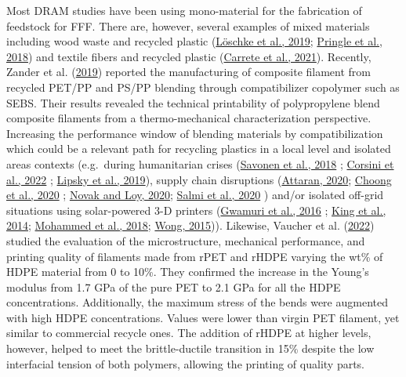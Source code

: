 \documentclass[
  12pt,
]{article}
\begin{document}
Most DRAM studies have been using mono-material for the fabrication of
feedstock for FFF. There are, however, several examples of mixed
materials including wood waste and recycled plastic
(\protect\hyperlink{ref-loschke2019}{Löschke et al., 2019};
\protect\hyperlink{ref-pringle2018}{Pringle et al., 2018}) and textile
fibers and recycled plastic (\protect\hyperlink{ref-carrete2021}{Carrete
et al., 2021}). Recently, Zander et al.
(\protect\hyperlink{ref-Zander2019}{2019}) reported the manufacturing of
composite filament from recycled PET/PP and PS/PP blending through
compatibilizer copolymer such as SEBS. Their results revealed the
technical printability of polypropylene blend composite filaments from a
thermo-mechanical characterization perspective. Increasing the
performance window of blending materials by compatibilization which
could be a relevant path for recycling plastics in a local level and
isolated areas contexts (e.g.~during humanitarian crises
(\protect\hyperlink{ref-savonen2018}{Savonen et al., 2018} ;
\protect\hyperlink{ref-corsini2022}{Corsini et al., 2022} ;
\protect\hyperlink{ref-lipsky2019}{Lipsky et al., 2019}), supply chain
disruptions (\protect\hyperlink{ref-attaran2020}{Attaran, 2020};
\protect\hyperlink{ref-choong2020}{Choong et al., 2020} ;
\protect\hyperlink{ref-novak2020}{Novak and Loy, 2020};
\protect\hyperlink{ref-salmi2020}{Salmi et al., 2020} ) and/or isolated
off-grid situations using solar-powered 3-D printers
(\protect\hyperlink{ref-gwamuri2016}{Gwamuri et al., 2016} ;
\protect\hyperlink{ref-king2014}{King et al., 2014};
\protect\hyperlink{ref-Mohammed2018}{Mohammed et al., 2018};
\protect\hyperlink{ref-wong2015}{Wong, 2015})). Likewise, Vaucher et al.
(\protect\hyperlink{ref-vaucher2022}{2022}) studied the evaluation of
the microstructure, mechanical performance, and printing quality of
filaments made from rPET and rHDPE varying the wt\% of HDPE material
from 0 to 10\%. They confirmed the increase in the Young's modulus from
1.7 GPa of the pure PET to 2.1 GPa for all the HDPE concentrations.
Additionally, the maximum stress of the bends were augmented with high
HDPE concentrations. Values were lower than virgin PET filament, yet
similar to commercial recycle ones. The addition of rHDPE at higher
levels, however, helped to meet the brittle-ductile transition in 15\%
despite the low interfacial tension of both polymers, allowing the
printing of quality parts.
\end{document}
